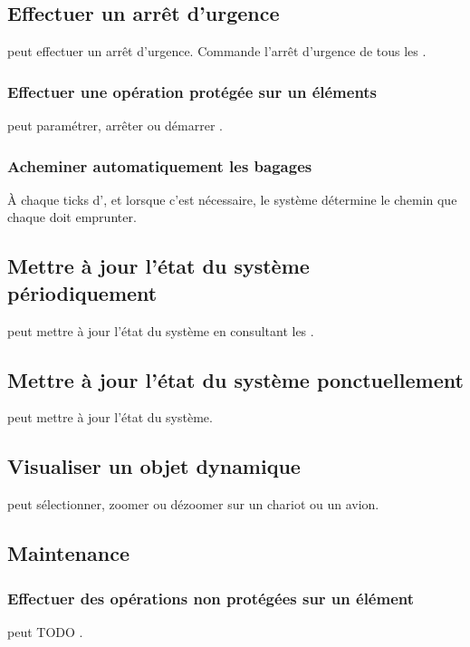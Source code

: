 \subsection{Effectuer un arrêt d'urgence}
 peut effectuer un arrêt d'urgence. Commande l'arrêt d'urgence de tous les .

\subsubsection{Effectuer une opération protégée sur un éléments}
 peut paramétrer, arrêter ou démarrer .

\subsubsection{Acheminer automatiquement les bagages}
À chaque ticks d', et lorsque c'est nécessaire, le système détermine le chemin que chaque  doit emprunter.

\subsection{Mettre à jour l'état du système périodiquement}
 peut mettre à jour l'état du système en consultant les .

\subsection{Mettre à jour l'état du système ponctuellement}
 peut mettre à jour l'état du système.

\subsection{Visualiser un objet dynamique}
 peut sélectionner, zoomer ou dézoomer sur un chariot ou un avion.

\subsection{Maintenance}

\subsubsection{Effectuer des opérations non protégées sur un élément}
 peut TODO .

